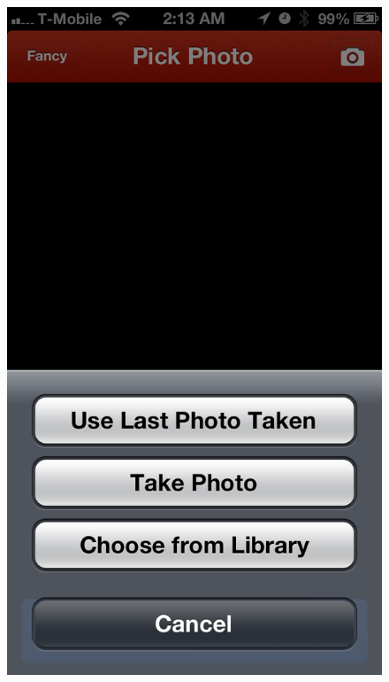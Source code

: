 \begin{figure}
{	\includegraphics[width=\figwidth, totalheight=\figheight, keepaspectratio]{./screenshots/home-pickaction.png}} \hfill
\end{figure}
